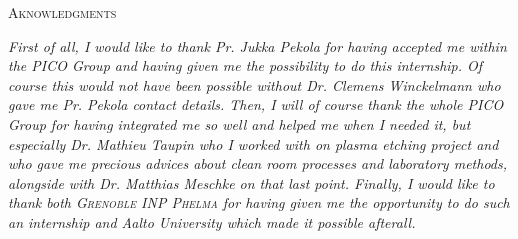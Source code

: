 \pagestyle{empty}
\begin{center}
{\Large \textsc{Aknowledgments}}
\vspace{0.5cm}

\textit{First of all, I would like to thank Pr. Jukka Pekola for having accepted me within the PICO Group and having given me the possibility to do this internship. Of course this would not have been possible without Dr. Clemens Winckelmann who gave me Pr. Pekola contact details. Then, I will of course thank the whole PICO Group for having integrated me so well and helped me when I needed it, but especially Dr. Mathieu Taupin who I worked with on plasma etching project and who gave me precious advices about clean room processes and laboratory methods, alongside with Dr. Matthias Meschke on that last point. Finally, I would like to thank both \textsc{Grenoble INP Phelma} for having given me the opportunity to do such an internship and Aalto University which made it possible afterall.}
\end{center}
